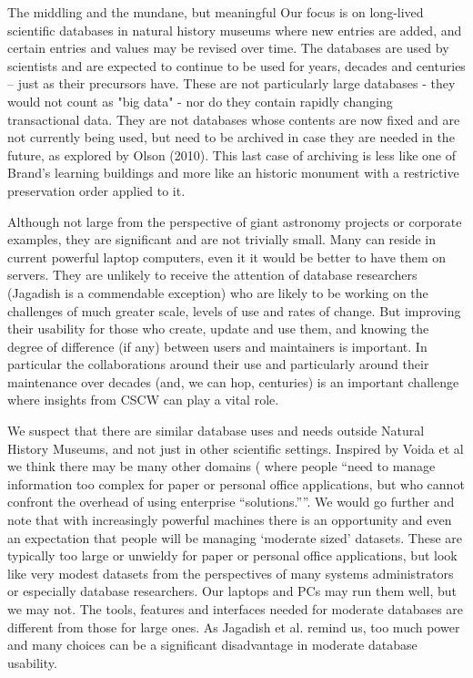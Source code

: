 The middling and the mundane, but meaningful
Our focus is on long-lived scientific databases in natural history museums where new entries are added, and certain entries and values may be revised over time. The databases are used by scientists and are expected to continue to be used for years, decades and centuries – just as their precursors have. These are not particularly large databases - they would not count as "big data" - nor do they contain rapidly changing transactional data. They are not databases whose contents are now fixed and are not currently being used, but need to be archived in case they are  needed in the future, as explored by Olson (2010). This last case of archiving is less like one of Brand’s learning buildings and more like an historic monument with a restrictive preservation order applied to it.

Although not large from the perspective of giant astronomy projects or corporate examples, they are  significant and are not trivially small. Many can reside in current powerful laptop computers, even it it would be better to have them on servers. They are unlikely to receive the attention of database researchers (Jagadish is a commendable exception) who are likely to be working on the challenges of much greater scale, levels of use and rates of change. But improving their usability for those who create, update and use them, and knowing the degree of difference (if any) between users and maintainers is important. In particular the collaborations around their use and particularly around their maintenance over decades (and, we can hop, centuries) is an important challenge where insights from CSCW can play a vital role.

We suspect that there are similar database uses and needs outside Natural History Museums, and not just in other scientific settings. Inspired by Voida et al we think there may be  many other domains ( where people “need to manage information too complex for paper or personal office applications, but who cannot confront the overhead of using enterprise “solutions.””. We would go further and note that with increasingly powerful machines there is an opportunity and even an expectation that people will be managing ‘moderate sized’ datasets. These are typically too large or unwieldy for paper or personal office applications, but look like very modest datasets from the perspectives of many systems administrators or especially database researchers. Our laptops and PCs may run them well, but we may not. The tools, features and interfaces needed for moderate databases are different from those for large ones. As Jagadish et al. remind us, too much power and many choices can be a significant disadvantage in moderate database usability.


